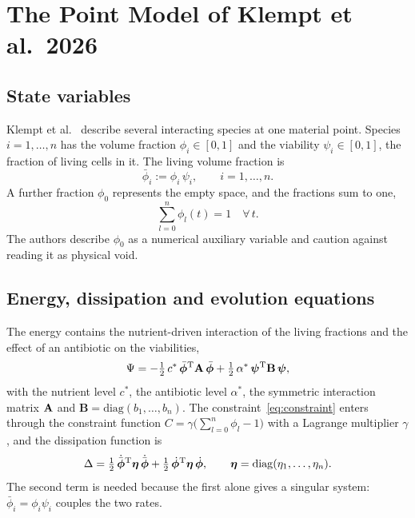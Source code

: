 \section{The Point Model of Klempt et al.\ 2026}
\label{sec:theory_point}

\subsection{State variables}

Klempt et al.~\cite{Klempt2026ContinuumBacterialGrowth} describe several
interacting species at one material point. Species $i=1,\dots,n$ has the volume
fraction $\phi_i\in[0,1]$ and the viability $\psi_i\in[0,1]$, the fraction of
living cells in it. The living volume fraction is
\begin{equation}
  \bar{\phi}_i := \phi_i\,\psi_i, \qquad i = 1,\dots,n.
  \label{eq:living}
\end{equation}
A further fraction $\phi_0$ represents the empty space, and the fractions sum to
one,
\begin{equation}
  \sum_{l=0}^{n} \phi_l(t) = 1 \quad \forall\, t.
  \label{eq:constraint}
\end{equation}
The authors describe $\phi_0$ as a numerical auxiliary variable and caution
against reading it as physical void.

\subsection{Energy, dissipation and evolution equations}

The energy contains the nutrient-driven interaction of the living fractions
and the effect of an antibiotic on the viabilities,
\begin{equation}
  \Psi = -\tfrac{1}{2}\,c^*\,\bar{\boldsymbol{\phi}}^{\rm T} \mathbf{A}\,\bar{\boldsymbol{\phi}}
        + \tfrac{1}{2}\,\alpha^*\,\boldsymbol{\psi}^{\rm T} \mathbf{B}\,\boldsymbol{\psi},
  \label{eq:free_energy}
\end{equation}
with the nutrient level $c^*$, the antibiotic level $\alpha^*$, the symmetric
interaction matrix $\mathbf{A}$ and $\mathbf B=\mathrm{diag}(b_1,\dots,b_n)$. The
constraint~\eqref{eq:constraint} enters through the constraint function
$C=\gamma\bigl(\sum_{l=0}^{n}\phi_l-1\bigr)$ with a Lagrange multiplier $\gamma$,
and the dissipation function is
\begin{equation}
  \Delta = \tfrac{1}{2}\,\dot{\bar{\boldsymbol{\phi}}}^{\rm T} \boldsymbol{\eta}\,\dot{\bar{\boldsymbol{\phi}}}
              + \tfrac{1}{2}\,\dot{\boldsymbol{\phi}}^{\rm T} \boldsymbol{\eta}\,\dot{\boldsymbol{\phi}},
  \qquad \boldsymbol{\eta} = \mathrm{diag}(\eta_1,\dots,\eta_n).
  \label{eq:dissipation}
\end{equation}
The second term is needed because the first alone gives a singular system:
$\bar\phi_i=\phi_i\psi_i$ couples the two rates.

